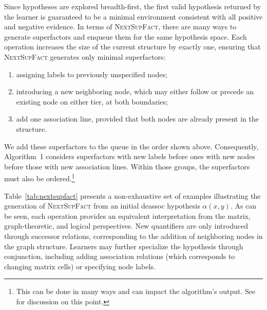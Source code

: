 \documentclass[pmlr]{jmlr}%
\newcommand{\hijeff}[1]{%
	\textcolor{violet}{\textbf{[#1]}}%
}
\begin{document}
	Since hypotheses are explored breadth-first, the first valid hypothesis
	returned by the learner is guaranteed to be a minimal
	environment consistent with all positive and negative evidence.
	In terms of \textsc{NextSupFact}, there are many ways to generate
	superfactors and enqueue them for the same hypothesis space. Each
	operation increases the size of the current structure by exactly one,
	ensuring that \textsc{NextSupFact} generates only minimal
	superfactors:
	\begin{enumerate}[label=(\roman*),noitemsep]
		\item assigning labels to previously unspecified nodes;
		\item introducing a new neighboring node, which may either
		follow or precede an existing node on either tier, at both boundaries;
		\item add one association line, provided that both
		nodes are already present in the structure.
	\end{enumerate}
	We add these superfactors to the queue in the order shown above.
	Consequently, Algorithm~1 considers superfactors with new labels before ones with new nodes before those with new association lines.
	Within those groups, the superfactors must also be ordered.\footnote{This can be done in many ways and can impact the algorithm's output. See \citet{rawski2021structure} for discussion on this point.}
	
	Table~\ref{tab:nextsupfact} presents a non-exhaustive set
	of examples illustrating the generation of
	\textsc{NextSupFact} from an initial \textsf{deassoc}
	hypothesis \(\alpha(x,y)\). 
	As can be seen, each operation provides an equivalent
	interpretation from the matrix, graph-theoretic, and logical
	perspectives. New quantifiers are
	only introduced through successor %
	relations, corresponding to the 
	addition of neighboring nodes in the graph structure. Learners
	may further specialize the hypothesis 
	through conjunction, including adding association relations 
	(which corresponds to changing matrix cells) or specifying node labels.
	
	
\end{document}
